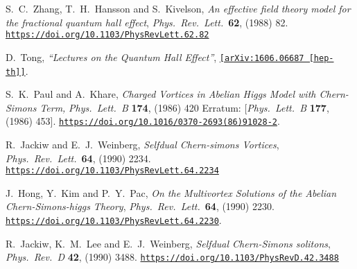 \documentclass[12pt,a4paper]{article}
\begin{document}
  \begin{thebibliography}{99} 
  S.~C.~Zhang, T.~H.~Hansson and S.~Kivelson,
  {\it An effective field theory model for the fractional quantum hall effect},
  {\it Phys.\ Rev.\ Lett.}\  {\bf 62}, (1988) 82.
  \href{https://doi.org/10.1103/PhysRevLett.62.82}{\tt https://doi.org/10.1103/PhysRevLett.62.82}
  
  D.~Tong,
 {\it ``Lectures on the Quantum Hall Effect''},
  \href{https://arxiv.org/abs/1606.06687}{\tt[arXiv:1606.06687 [hep-th]]}.
  
  S.~K.~Paul and A.~Khare,
  {\it Charged Vortices in Abelian Higgs Model with Chern-Simons Term,}
  {\it Phys.\ Lett.\ B} {\bf 174}, (1986) 420
  Erratum: [{\it Phys.\ Lett.\ B} {\bf 177}, (1986) 453].
 \href{https://doi.org/10.1016/0370-2693(86)91028-2}{\tt https://doi.org/10.1016/0370-2693(86)91028-2}.

  R.~Jackiw and E.~J.~Weinberg,
  {\it Selfdual Chern-simons Vortices},
  {\it Phys.\ Rev.\ Lett.}\  {\bf 64}, (1990) 2234.
  \href{https://doi.org/10.1103/PhysRevLett.64.2234}{\tt https://doi.org/10.1103/PhysRevLett.64.2234}


  J.~Hong, Y.~Kim and P.~Y.~Pac,
  {\it On the Multivortex Solutions of the Abelian {Chern-Simons}-higgs Theory},
  {\it Phys.\ Rev.\ Lett.}\  {\bf 64},  (1990) 2230.
  \href{https://doi.org/10.1103/PhysRevLett.64.2230}{\tt https://doi.org/10.1103/PhysRevLett.64.2230}.
  
  R.~Jackiw, K.~M.~Lee and E.~J.~Weinberg,
  {\it Selfdual Chern-Simons solitons},
  {\it Phys.\ Rev.\ D} {\bf 42}, (1990) 3488.
 \href{https://doi.org/10.1103/PhysRevD.42.3488}{\tt https://doi.org/10.1103/PhysRevD.42.3488}
  


\end{thebibliography}
\end{document}
